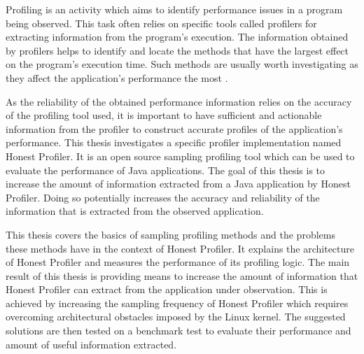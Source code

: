 \documentclass[..thesis.tex]{subfiles}
\begin{document}
Profiling is an activity which aims to identify performance issues in a program being observed. This task often relies on specific tools called profilers for extracting information from the program's execution. The information obtained by profilers helps to identify and locate the methods that have the largest effect on the program's execution time. Such methods are usually worth investigating as they affect the application's performance the most \cite{mytkowicz_evaluating_2010}.


As the reliability of the obtained performance information relies on the accuracy of the profiling tool used, it is important to have sufficient and actionable information from the profiler to construct accurate profiles of the application's performance. This thesis investigates a specific profiler implementation named Honest Profiler. It is an open source sampling profiling tool which can be used to evaluate the performance of Java applications. The goal of this thesis is to increase the amount of information extracted from a Java application by Honest Profiler. Doing so potentially increases the accuracy and reliability of the information that is extracted from the observed application. 

This thesis covers the basics of sampling profiling methods and the problems these methods have in the context of Honest Profiler. It explains the architecture of Honest Profiler and measures the performance of its profiling logic. The main result of this thesis is providing means to increase the amount of information that Honest Profiler can extract from the application under observation. This is achieved by increasing the sampling frequency of Honest Profiler which requires overcoming architectural obstacles imposed by the Linux kernel. The suggested solutions are then tested on a benchmark test to evaluate their performance and amount of useful information extracted.


\end{document}
